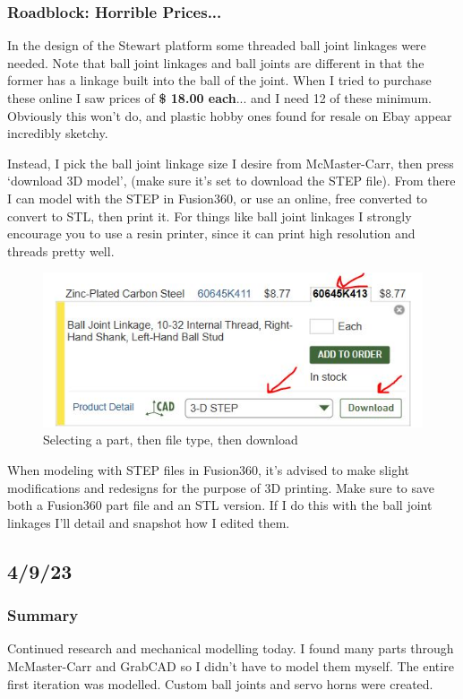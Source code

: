 \documentclass[a4paper, 10pt]{article}
\begin{document}
		\subsubsection{Roadblock: Horrible Prices...}
		In the design of the Stewart platform some threaded ball joint linkages were needed. Note that ball joint linkages and ball joints are different in that the former has a linkage built into the ball of the joint. When I tried to purchase these online I saw prices of \textbf{\$ 18.00 each}... and I need 12 of these minimum. Obviously this won't do, and plastic hobby ones found for resale on Ebay appear incredibly sketchy.
		
		Instead, I pick the ball joint linkage size I desire from McMaster-Carr, then press `download 3D model', (make sure it's set to download the STEP file). From there I can model with the STEP in Fusion360, or use an online, free converted to convert to STL, then print it. For things like ball joint linkages I strongly encourage you to use a resin printer, since it can print high resolution and threads pretty well.
		
		\begin{figure} [h]
			\centering
			\includegraphics[scale=0.75]{mcmaster_models}
			\caption{Selecting a part, then file type, then download}
			\label{getting_models}
		\end{figure}
		
		When modeling with STEP files in Fusion360, it's advised to make slight modifications and redesigns for the purpose of 3D printing. Make sure to save both a Fusion360 part file and an STL version. If I do this with the ball joint linkages I'll detail and snapshot how I edited them.
		
	\subsection{4/9/23}
		\subsubsection{Summary}
		Continued research and mechanical modelling today. I found many parts through McMaster-Carr and GrabCAD so I didn't have to model them myself. The entire first iteration was modelled. Custom ball joints and servo horns were created.
		
\end{document}
